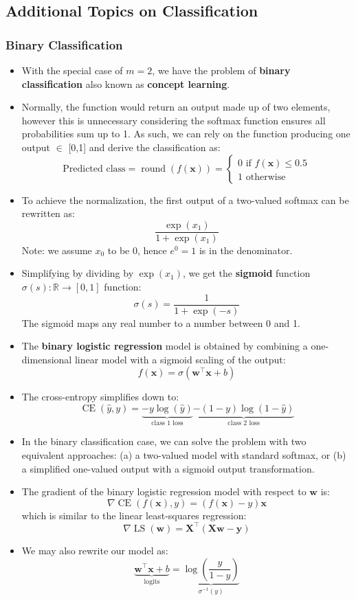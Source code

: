 \documentclass{article}
\newcommand{\tbf}[1]{\textbf{#1}}
\newcommand{\mbf}[1]{\mathbf{#1}}
\begin{document}
    \subsection{Additional Topics on Classification}
    \subsubsection{Binary Classification}
    \begin{itemize}
        \item With the special case of $m=2$, we have the problem of \tbf{binary classification} also known as \tbf{concept learning}.
        \item Normally, the function would return an output made up of two elements, however this is unnecessary considering the softmax function 
        ensures all probabilities sum up to 1. As such, we can rely on the function producing one output $\in$ [0,1] and derive the classification as:
        \[
        \text{Predicted class} = \operatorname{round}(f(\mbf{x})) = 
        \begin{cases}
            0 \text{ if } f(\mbf{x}) \leq 0.5 \\
            1 \text{ otherwise }
        \end{cases}
        \]
        \item To achieve the normalization, the first output of a two-valued softmax can be rewritten as:
        \[\frac{\operatorname{exp}(x_1)}{1+\operatorname{exp}(x_1)}\]
        Note: we assume $x_0$ to be 0, hence $e^0 = 1$ is in the denominator.
        \item Simplifying by dividing by $\exp(x_1)$, we get the \tbf{sigmoid} function $\sigma(s) : \mathbb{R} \rightarrow [0,1]$ function:
        \[\sigma(s) = \frac{1}{1+\exp(-s)}\]
        The sigmoid maps any real number to a number between 0 and 1.
        \item The \tbf{binary logistic regression} model is obtained by combining a one-dimensional linear model with a sigmoid scaling of the output:
        \[f(\mbf{x})= \sigma(\mbf{w^{\top}x}+b)\]
        \item The cross-entropy simplifies down to:
        \[\operatorname{CE}(\hat{y},y)=\underbrace{-y\log(\hat{y})}_{\text{class 1 loss}}\underbrace{-(1-y)\log(1-\hat{y})}_{\text{class 2 loss}}\]
        \item In the binary classification case, we can solve the problem with two equivalent approaches: (a) a two-valued model with standard softmax,
        or (b) a simplified one-valued output with a sigmoid output transformation.
        \item The gradient of the binary logistic regression model with respect to $\mbf{w}$ is:
        \[\nabla \operatorname{CE}(f(\mbf{x}),y)=(f(\mbf{x})-y)\mbf{x}\]
        which is similar to the linear least-squares regression:
        \[\nabla \operatorname{LS}(\mbf{w})=\mbf{X^{\top}(Xw-y)}\]
        \item We may also rewrite our model as:
        \[\underbrace{\mbf{w^{\top}x}+b}_{\text{logits}}=\underbrace{\log(\frac{y}{1-y})}_{\sigma^{-1}(y)}\]
    \end{itemize}
\end{document}
